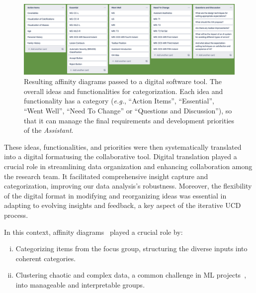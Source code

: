 \begin{figure}[htbp]
\centering
\includegraphics[width=\columnwidth]{images/fig039}
\caption{Resulting affinity diagrams passed to a digital software tool. The overall ideas and functionalities for categorization. Each idea and functionality has a category ({\it e.g.}, ``Action Items'', ``Essential'', ``Went Well'', ``Need To Change'' or ``Questions and Discussion''), so that it can manage the final requirements and development priorities of the {\it Assistant}.}
\label{fig:fig039}
\end{figure}

\textcolor{revised}{These ideas, functionalities, and priorities were then systematically translated into a digital format\footnotemark[7] using the collaborative tool.
Digital translation played a crucial role in streamlining data organization and enhancing collaboration among the research team.
It facilitated comprehensive insight capture and categorization, improving our data analysis's robustness.
Moreover, the flexibility of the digital format in modifying and reorganizing ideas was essential in adapting to evolving insights and feedback, a key aspect of the iterative \ac{UCD} process.}


\vspace{1.00mm}

\noindent
\textcolor{revised}{In this context, affinity diagrams~\cite{10.1145/3290605.3300628} played a crucial role by:}

\vspace{0.10mm}

\begin{enumerate}[(i)]
\item \textcolor{revised}{Categorizing items from the focus group, structuring the diverse inputs into coherent categories.}
\item \textcolor{revised}{Clustering chaotic and complex data, a common challenge in \ac{ML} projects~\cite{10.1145/2858036.2858373, 10.1145/3343413.3377983}, into manageable and interpretable groups.}
\end{enumerate}

